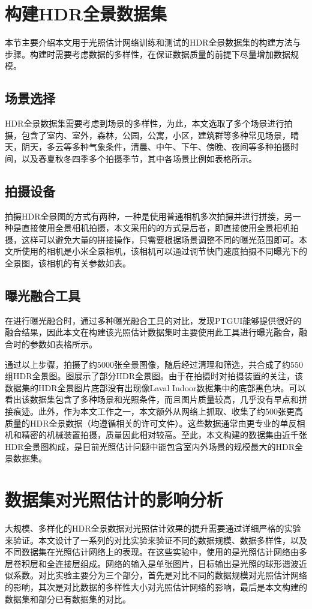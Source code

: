 \section{构建HDR全景数据集}
本节主要介绍本文用于光照估计网络训练和测试的HDR全景数据集的构建方法与步骤。构建时需要考虑数据的多样性，在保证数据质量的前提下尽量增加数据规模。
\subsection{场景选择}
HDR全景数据集需要考虑到场景的多样性，为此，本文选取了多个场景进行拍摄，包含了室内、室外，森林，公园，公寓，小区，建筑群等多种常见场景，晴天，阴天，多云等多种气象条件，清晨、中午、下午、傍晚、夜间等多种拍摄时间，以及春夏秋冬四季多个拍摄季节，其中各场景比例如表格所示。
\subsection{拍摄设备}
拍摄HDR全景图的方式有两种，一种是使用普通相机多次拍摄并进行拼接，另一种是直接使用全景相机拍摄，本文采用的的方式是后者，即直接使用全景相机拍摄，这样可以避免大量的拼接操作，只需要根据场景调整不同的曝光范围即可。本文所使用的相机是小米全景相机\cite{xiaomi}，该相机可以通过调节快门速度拍摄不同曝光下的全景图，该相机的有关参数如表。
\subsection{曝光融合工具}
在进行曝光融合时，通过多种曝光融合工具的对比，发现PTGUI\cite{ptgui}能够提供很好的融合结果，因此本文在构建该光照估计数据集时主要使用此工具进行曝光融合，融合时的参数如表格所示。

通过以上步骤，拍摄了约5000张全景图像，随后经过清理和筛选，共合成了约550组HDR全景图。图展示了部分HDR全景图。由于在拍摄时对拍摄装置的关注，该数据集的HDR全景图片底部没有出现像Laval Indoor数据集\cite{gardner2017learning}中的底部黑色块。可以看出该数据集包含了多种场景和光照条件，而且图片质量较高，几乎没有早点和拼接痕迹。此外，作为本文工作之一，本文额外从网络上抓取、收集了约500张更高质量的HDR全景数据（均遵循相关的许可文件）。这些数据通常由更专业的单反相机和精密的机械装置拍摄，质量因此相对较高。至此，本文构建的数据集由近千张HDR全景图构成，是目前光照估计问题中能包含室内外场景的规模最大的HDR全景数据集。

\section{数据集对光照估计的影响分析}
大规模、多样化的HDR全景数据对光照估计效果的提升需要通过详细严格的实验来验证。本文设计了一系列的对比实验来验证不同的数据规模、数据多样性，以及不同数据集在光照估计网络上的表现。在这些实验中，使用的是光照估计网络由多层卷积层和全连接层组成。网络的输入是单张图片，目标输出是光照的球形谐波近似系数。对比实验主要分为三个部分，首先是对比不同的数据规模对光照估计网络的影响，其次是对比数据的多样性大小对光照估计网络的影响，最后是本文构建的数据集和部分已有数据集的对比。

